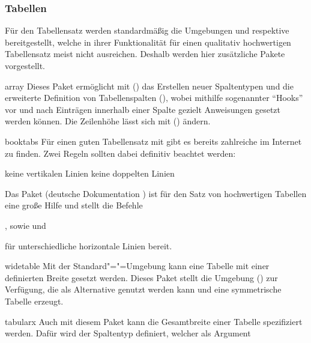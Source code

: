 \subsubsection{Tabellen}
%
%
Für den Tabellensatz werden standardmäßig die Umgebungen  
und  respektive  bereitgestellt, 
welche in ihrer Funktionalität für einen qualitativ hochwertigen Tabellensatz 
meist nicht ausreichen. Deshalb werden hier zusätzliche Pakete vorgestellt. 
%
\begin{packages}
\item[array]
  Dieses Paket ermöglicht mit () das   
  Erstellen neuer Spaltentypen und die erweiterte Definition von Tabellenspalten
  (\PValue{>\PParameter{\dots}}\PValue{<\PParameter{\dots}}), 
  wobei mithilfe sogenannter \enquote{Hooks} vor und nach Einträgen innerhalb 
  einer Spalte gezielt Anweisungen gesetzt werden können. Die Zeilenhöhe lässt 
  sich mit () ändern. 
\item[booktabs]
  Für einen guten Tabellensatz mit  gibt es bereits zahlreiche 
   im 
  Internet zu finden. Zwei Regeln sollten dabei definitiv beachtet werden:
  \begin{enumerate}[itemindent=0pt,labelwidth=*,labelsep=1em,label=\Roman*.]
  \stditem keine vertikalen Linien
  \stditem keine doppelten Linien
  \end{enumerate}
  Das Paket  (deutsche Dokumentation ) 
  ist für den Satz von hochwertigen Tabellen eine große Hilfe und stellt die 
  Befehle 
  \begin{Bundle}{}
  ,  sowie  und 
  \end{Bundle}
  für unterschiedliche horizontale Linien bereit.
\item[widetable]
  Mit der Standard"="=Umgebung  kann eine 
  Tabelle mit einer definierten Breite gesetzt werden. Dieses Paket stellt die 
  Umgebung () zur Verfügung, die als 
  Alternative genutzt werden kann und eine symmetrische Tabelle erzeugt.
\item[tabularx]
  Auch mit diesem Paket kann die Gesamtbreite einer Tabelle spezifiziert 
  werden. Dafür wird der Spaltentyp  definiert, welcher als Argument 

\end{packages}
